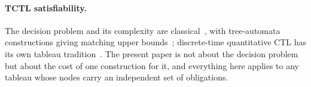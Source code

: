 \paragraph{TCTL satisfiability.} The decision problem and its complexity are
classical~\cite{AlurCourcoubetisDill1990,AlurHenzinger1994ReallyTemporal}, with
tree-automata constructions giving matching upper
bounds~\cite{LaTorreNapoli2001TimedTreeAutomata}; discrete-time quantitative
CTL has its own tableau
tradition~\cite{EmersonEtAl1992QuantitativeTemporalReasoning}. The present paper
is not about the decision problem but about the cost of one construction for it,
and everything here applies to any tableau whose nodes carry an independent
set of obligations.
